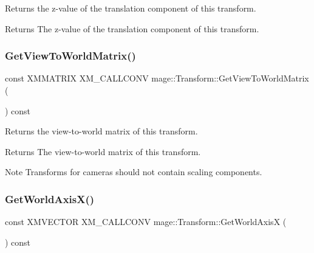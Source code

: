 Returns the z-\/value of the translation component of this transform.

\begin{DoxyReturn}{Returns}
The z-\/value of the translation component of this transform. 
\end{DoxyReturn}
\hypertarget{classmage_1_1_transform_a93b1f562a9f1358d40232424b1e9a3b8}{}\label{classmage_1_1_transform_a93b1f562a9f1358d40232424b1e9a3b8} 
\subsubsection{\texorpdfstring{Get\+View\+To\+World\+Matrix()}{GetViewToWorldMatrix()}}
{\footnotesize\ttfamily const X\+M\+M\+A\+T\+R\+IX X\+M\+\_\+\+C\+A\+L\+L\+C\+O\+NV mage\+::\+Transform\+::\+Get\+View\+To\+World\+Matrix (\begin{DoxyParamCaption}{ }\end{DoxyParamCaption}) const\hspace{0.3cm}{\ttfamily [noexcept]}}

Returns the view-\/to-\/world matrix of this transform.

\begin{DoxyReturn}{Returns}
The view-\/to-\/world matrix of this transform. 
\end{DoxyReturn}
\begin{DoxyNote}{Note}
Transforms for cameras should not contain scaling components. 
\end{DoxyNote}
\hypertarget{classmage_1_1_transform_aeb6b744fbe9843a7323fdde88421c3b4}{}\label{classmage_1_1_transform_aeb6b744fbe9843a7323fdde88421c3b4} 
\subsubsection{\texorpdfstring{Get\+World\+Axis\+X()}{GetWorldAxisX()}}
{\footnotesize\ttfamily const X\+M\+V\+E\+C\+T\+OR X\+M\+\_\+\+C\+A\+L\+L\+C\+O\+NV mage\+::\+Transform\+::\+Get\+World\+AxisX (\begin{DoxyParamCaption}{ }\end{DoxyParamCaption}) const\hspace{0.3cm}{\ttfamily [noexcept]}}

